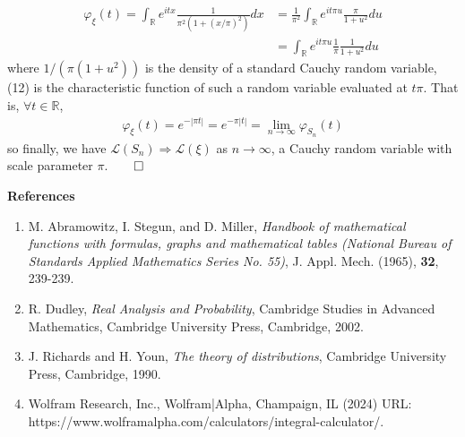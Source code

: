 \documentclass[10pt]{article}
\newcommand{\mbb}[1]{\mathbb{#1}}
\newcommand{\1}[1]{\mathbbm{1}_{#1}}
\newcommand{\mc}[1]{\mathcal{#1}}
\begin{document}
    \begin{align*}
        \varphi_\xi(t)=\int_\mbb{R}e^{itx}\frac{1}{\pi^2(1+(x/\pi)^2)}dx&=\frac{1}{\pi^2}\int_\mbb{R}e^{it\pi u}\frac{\pi}{1+u^2}du\tag{setting $u=x/\pi$}\\
        &=\int_\mbb{R}e^{it\pi u}\frac{1}{\pi}\frac{1}{1+u^2}du\tag{12}
    \end{align*}
    where $1/(\pi(1+u^2))$ is the density of a standard Cauchy random variable, (12) is the characteristic function of such a random variable evaluated at $t\pi$. That is, $\forall t\in\mbb{R}$,
    \begin{align*}
        \varphi_\xi(t)=e^{-|\pi t|}=e^{-\pi|t|}=\lim_{n\rightarrow\infty}\varphi_{S_n}(t)
    \end{align*}
    so finally, we have $\mc{L}(S_n)\Longrightarrow\mc{L}(\xi)$ as $n\rightarrow\infty$, a Cauchy random variable with scale parameter $\pi$.\hfill{$\qed$}\\[15pt]
    \begin{center}
        {\bf\large References}
    \end{center}
    \begin{enumerate}
        \item M. Abramowitz, I. Stegun, and D. Miller, {\it Handbook of mathematical functions with formulas, graphs and mathematical tables (National Bureau of Standards Applied Mathematics Series No. 55)}, J. Appl. Mech. (1965), \textbf{32}, 239-239.
        \item R. Dudley, {\it Real Analysis and Probability}, Cambridge Studies in Advanced Mathematics, Cambridge University Press, Cambridge, 2002.
        \item J. Richards and H. Youn, {\it The theory of distributions}, Cambridge University Press, Cambridge, 1990.
        \item Wolfram Research, Inc., Wolfram|Alpha, Champaign, IL (2024) URL: https://www.wolframalpha.com/calculators/integral-calculator/.
    \end{enumerate}
\end{document}
